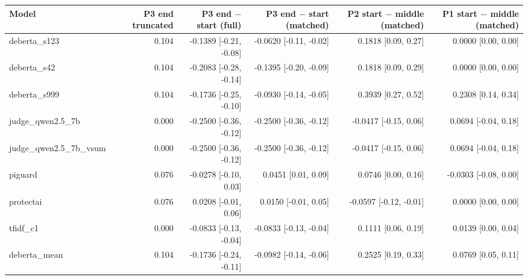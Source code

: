 \begin{tabular}{lrrrrr}
\toprule
\textbf{Model} & \textbf{P3 end truncated} & \textbf{P3 end $-$ start (full)} & \textbf{P3 end $-$ start (matched)} & \textbf{P2 start $-$ middle (matched)} & \textbf{P1 start $-$ middle (matched)} \\
\midrule
deberta\_s123 & 0.104 & -0.1389 {\scriptsize[-0.21, -0.08]} & -0.0620 {\scriptsize[-0.11, -0.02]} & 0.1818 {\scriptsize[0.09, 0.27]} & 0.0000 {\scriptsize[0.00, 0.00]} \\
deberta\_s42 & 0.104 & -0.2083 {\scriptsize[-0.28, -0.14]} & -0.1395 {\scriptsize[-0.20, -0.09]} & 0.1818 {\scriptsize[0.09, 0.29]} & 0.0000 {\scriptsize[0.00, 0.00]} \\
deberta\_s999 & 0.104 & -0.1736 {\scriptsize[-0.25, -0.10]} & -0.0930 {\scriptsize[-0.14, -0.05]} & 0.3939 {\scriptsize[0.27, 0.52]} & 0.2308 {\scriptsize[0.14, 0.34]} \\
judge\_qwen2.5\_7b & 0.000 & -0.2500 {\scriptsize[-0.36, -0.12]} & -0.2500 {\scriptsize[-0.36, -0.12]} & -0.0417 {\scriptsize[-0.15, 0.06]} & 0.0694 {\scriptsize[-0.04, 0.18]} \\
judge\_qwen2.5\_7b\_vsum & 0.000 & -0.2500 {\scriptsize[-0.36, -0.12]} & -0.2500 {\scriptsize[-0.36, -0.12]} & -0.0417 {\scriptsize[-0.15, 0.06]} & 0.0694 {\scriptsize[-0.04, 0.18]} \\
piguard & 0.076 & -0.0278 {\scriptsize[-0.10, 0.03]} & 0.0451 {\scriptsize[0.01, 0.09]} & 0.0746 {\scriptsize[0.00, 0.16]} & -0.0303 {\scriptsize[-0.08, 0.00]} \\
protectai & 0.076 & 0.0208 {\scriptsize[-0.01, 0.06]} & 0.0150 {\scriptsize[-0.01, 0.05]} & -0.0597 {\scriptsize[-0.12, -0.01]} & 0.0000 {\scriptsize[0.00, 0.00]} \\
tfidf\_c1 & 0.000 & -0.0833 {\scriptsize[-0.13, -0.04]} & -0.0833 {\scriptsize[-0.13, -0.04]} & 0.1111 {\scriptsize[0.06, 0.19]} & 0.0139 {\scriptsize[0.00, 0.04]} \\
deberta\_mean & 0.104 & -0.1736 {\scriptsize[-0.24, -0.11]} & -0.0982 {\scriptsize[-0.14, -0.06]} & 0.2525 {\scriptsize[0.19, 0.33]} & 0.0769 {\scriptsize[0.05, 0.11]} \\
\bottomrule
\end{tabular}
